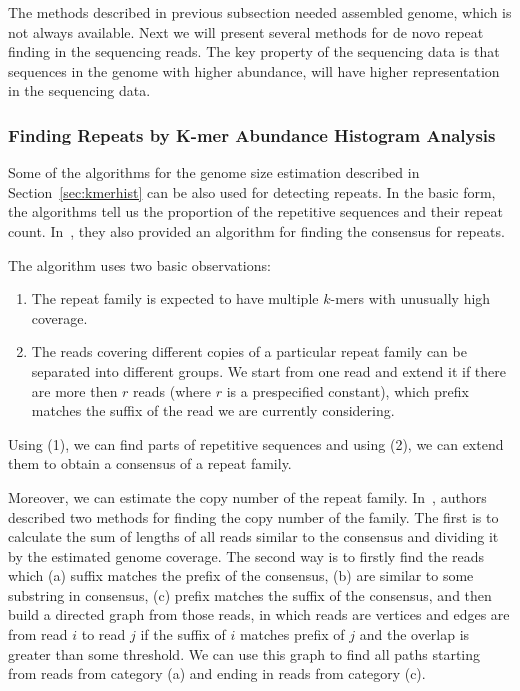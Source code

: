 The methods described in previous subsection needed assembled genome, which is not always available. Next we will present several methods for de novo repeat finding in the sequencing reads. The key property of the sequencing data is that sequences in the genome with higher abundance, will have higher representation in the sequencing data.

\subsubsection{Finding Repeats by K-mer Abundance Histogram Analysis}

Some of the algorithms for the genome size estimation described in Section~\ref{sec:kmerhist} can be also used for detecting repeats.
In the basic form, the algorithms tell us the proportion of the repetitive sequences and their repeat count. In~\cite{waterman}, they also provided an algorithm for finding the consensus for repeats.

The algorithm uses two basic observations:
\begin{enumerate}
  \item The repeat family is expected to have multiple $k$-mers with  unusually high coverage.
  \item The reads covering different copies of a particular repeat family can be separated into different groups.
  We start from one read and extend it if there are more then $r$ reads (where $r$ is a prespecified constant), which prefix matches the suffix of the read we are currently considering.
\end{enumerate}

Using (1), we can find parts of repetitive sequences and using (2), we can extend them to obtain a consensus of a repeat family.

Moreover, we can estimate the copy number of the repeat family. In~\cite{waterman}, authors described two methods for finding the copy number of the family.
The first is to calculate the sum of lengths of all reads similar to the consensus and dividing it by the estimated genome coverage.
The second way is to firstly find the reads which (a) suffix matches the prefix of the consensus, (b) are similar to some substring in consensus, (c) prefix matches the suffix of the consensus, and then build a directed graph from those reads, in which reads are vertices and edges are from read $i$ to read $j$ if the suffix of $i$ matches prefix of $j$ and the overlap is greater than some threshold. We can use this graph to find all paths starting from reads from category (a) and ending in reads from category (c).

